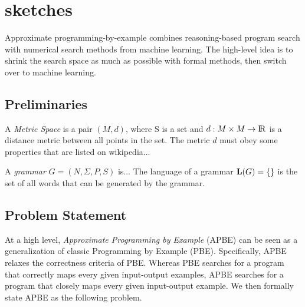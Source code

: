 \section{sketches}

Approximate programming-by-example combines reasoning-based program search with numerical search methods from machine learning.
The high-level idea is to shrink the search space as much as possible with formal methods, then switch over to machine learning.


\subsection{Preliminaries}
A \textit{Metric Space} is a pair $(M,d)$, where S is a set and $d:M \times M \to {\rm I\!R}$ is a distance metric between all points in the set. The metric $d$ must obey some properties that are listed on wikipedia...

\iffalse
I think I dont need this actually
A product metric $(X^{*},d_p)$ is a metric space over the Cartesian product of finitely many metric spaces $(X_0,d_0),...,(X_n,d_n)$,
  where $d_p:X^n \times X^n \to \reals$ also obey those properties.
If $d_p$ is a norm ``which is non-decreasing as the coordinates of a positive n-tuple increase``\footnote{took this from \url{https://en.wikipedia.org/wiki/Metric_space#Product_metric_spaces}, not sure how to formalize it yet}, then then topology of the X^* is equivelant
\fi

A \textit{grammar} $G = (N,\Sigma,P,S)$ is...
The language of a grammar $\mathbf{L}(G) = \{ \}$ is the set of all words that can be generated by the grammar.

\subsection{Problem Statement}
At a high level, \textit{Approximate Programming by Example} (APBE) can be seen as a generalization of classic Programming by Example (PBE).
Specifically, APBE relaxes the correctness criteria of PBE.
Whereas PBE searches for a program that correctly maps every given input-output examples, APBE searches for a program that closely maps every given input-output example.
We then formally state APBE as the following problem.

